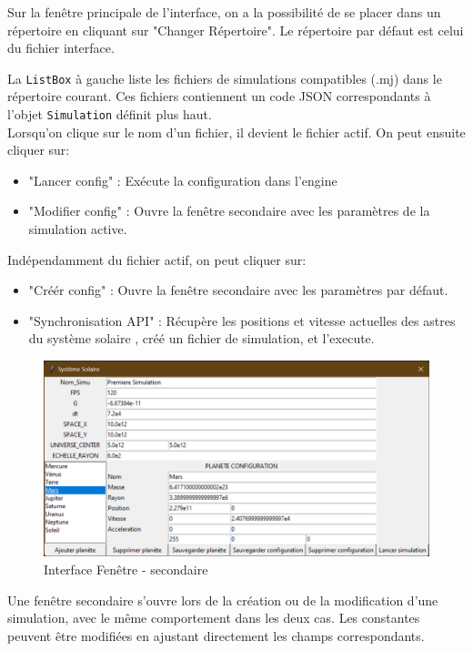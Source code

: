 \documentclass[a4paper, 12pt]{article}
\begin{document}
    Sur la fenêtre principale de l'interface, on a la possibilité de se placer dans un répertoire en cliquant sur "Changer Répertoire". Le répertoire par défaut est celui du fichier interface. 

    La \texttt{ListBox} à gauche liste les fichiers de simulations compatibles (.mj) dans le répertoire courant. Ces fichiers contiennent un code JSON correspondants à l'objet \texttt{Simulation} définit plus haut. \\

    Lorsqu'on clique sur le nom d'un fichier, il devient le fichier actif. On peut ensuite cliquer sur:

    \begin{itemize}
        \item "Lancer config" : Exécute la configuration dans l'engine
        \item "Modifier config" : Ouvre la fenêtre secondaire avec les paramètres de la simulation active. \\
    \end{itemize}

    Indépendamment du fichier actif, on peut cliquer sur:

    \begin{itemize}
        \item "Créér config" : Ouvre la fenêtre secondaire avec les paramètres par défaut.
        \item "Synchronisation API" : Récupère les positions et vitesse actuelles des astres du système solaire , créé un fichier de simulation, et l'execute.
    \end{itemize}

    \begin{figure}[H]
		\centering
		\includegraphics[width=0.4\linewidth]						{interfaceFenetreSecondaire.png}
		\caption{\label{fig: IntSec} Interface Fenêtre - secondaire}  
	\end{figure}

    Une fenêtre secondaire s'ouvre lors de la création ou de la modification d'une simulation, avec le même comportement dans les deux cas. Les constantes peuvent être modifiées en ajustant directement les champs correspondants. 
    
\end{document}
